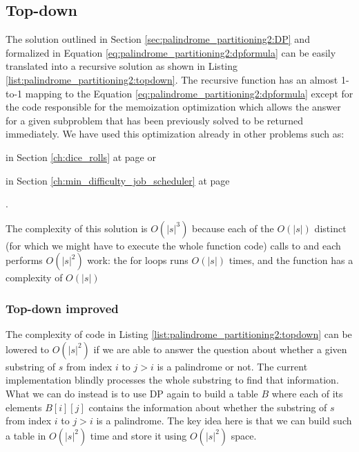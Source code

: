 \subsection{Top-down}
The solution outlined in Section \ref{sec:palindrome_partitioning2:DP} and formalized in Equation
\ref{eq:palindrome_partitioning2:dpformula} can be easily translated into a recursive solution as
shown in Listing \ref{list:palindrome_partitioning2:topdown}. The recursive function
 has an almost 1-to-1 mapping to the Equation
\ref{eq:palindrome_partitioning2:dpformula} except for the code responsible for the memoization
optimization which allows the answer for a given subproblem that has been previously solved
to be returned immediately. We have used this optimization already in other problems such as: 
\begin{enumerate*}
	\item  \textit{} in Section \ref{ch:dice_rolls} at page
	\pageref{ch:dice_rolls} or
	\item \textit{} in Section
\ref{ch:min_difficulty_job_scheduler} at page \pageref{ch:min_difficulty_job_scheduler}
\end{enumerate*}.


The complexity of this solution is $O(|s|^3)$ because each of the  $O(|s|)$ distinct (for which we
might have to execute the whole function code) calls to 
and each performs $O(|s|^2)$ work: the for loops runs $O(|s|)$ times, and the function
 has a complexity of $O(|s|)$

\subsubsection{Top-down improved}
\label{sec:palindrome_partitioning2:dptopdownimproved}
The complexity of code in Listing \ref{list:palindrome_partitioning2:topdown} can be lowered to
$O(|s|^2)$ if we are able to answer the question about whether a given substring of $s$ from
index $i$ to $j>i$ is a palindrome or not. The current implementation blindly processes the whole
substring to find that information. What we can do instead is to use DP again to
build a table $B$ where each of its elements $B[i][j]$ contains the information about whether the
substring of $s$ from index $i$ to $j>i$ is a palindrome. The key idea here is that we can build such a
table in $O(|s|^2)$ time and store it using $O(|s|^2)$ space. 

